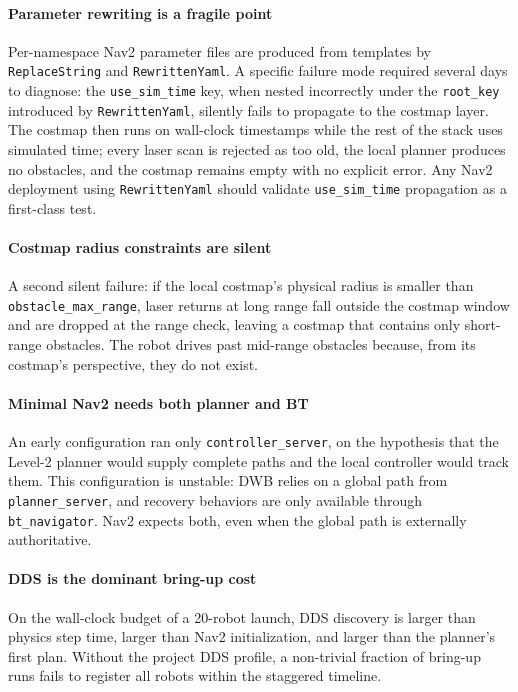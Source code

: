 \documentclass[conference]{IEEEtran}
\begin{document}
\paragraph{Parameter rewriting is a fragile point}
Per-namespace Nav2 parameter files are produced from templates
by \texttt{ReplaceString} and \texttt{RewrittenYaml}. A
specific failure mode required several days to diagnose: the
\texttt{use\_sim\_time} key, when nested incorrectly under the
\texttt{root\_key} introduced by \texttt{RewrittenYaml},
silently fails to propagate to the costmap layer. The costmap
then runs on wall-clock timestamps while the rest of the stack
uses simulated time; every laser scan is rejected as too old,
the local planner produces no obstacles, and the costmap
remains empty with no explicit error. Any Nav2 deployment
using \texttt{RewrittenYaml} should validate
\texttt{use\_sim\_time} propagation as a first-class test.

\paragraph{Costmap radius constraints are silent}
A second silent failure: if the local costmap's physical radius
is smaller than \texttt{obstacle\_max\_range}, laser returns
at long range fall outside the costmap window and are dropped
at the range check, leaving a costmap that contains only
short-range obstacles. The robot drives past mid-range
obstacles because, from its costmap's perspective, they do not
exist.

\paragraph{Minimal Nav2 needs both planner and BT}
An early configuration ran only \texttt{controller\_server},
on the hypothesis that the Level-2 planner would supply
complete paths and the local controller would track them. This
configuration is unstable: DWB relies on a global path from
\texttt{planner\_server}, and recovery behaviors are only
available through \texttt{bt\_navigator}. Nav2 expects both,
even when the global path is externally authoritative.

\paragraph{DDS is the dominant bring-up cost}
On the wall-clock budget of a 20-robot launch, DDS discovery
is larger than physics step time, larger than Nav2
initialization, and larger than the planner's first plan.
Without the project DDS profile, a non-trivial fraction of
bring-up runs fails to register all robots within the
staggered timeline.
\end{document}
